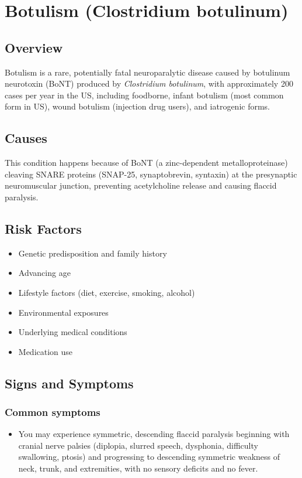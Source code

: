 \chapter{Botulism (Clostridium botulinum)}
\label{sec:Botulism}

\section{Overview}
Botulism is a rare, potentially fatal neuroparalytic disease caused by botulinum neurotoxin (BoNT) produced by \textit{Clostridium botulinum}, with approximately 200 cases per year in the US, including foodborne, infant botulism (most common form in US), wound botulism (injection drug users), and iatrogenic forms.
\section{Causes}
This condition happens because of BoNT (a zinc-dependent metalloproteinase) cleaving SNARE proteins (SNAP-25, synaptobrevin, syntaxin) at the presynaptic neuromuscular junction, preventing acetylcholine release and causing flaccid paralysis.     
\section{Risk Factors}

\begin{itemize}[noitemsep]
  \item Genetic predisposition and family history
  \item Advancing age
  \item Lifestyle factors (diet, exercise, smoking, alcohol)
  \item Environmental exposures
  \item Underlying medical conditions
  \item Medication use
\end{itemize}
\section{Signs and Symptoms}

\subsection{Common symptoms}
\begin{itemize}[noitemsep]
  \item You may experience symmetric, descending flaccid paralysis beginning with cranial nerve palsies (diplopia, slurred speech, dysphonia, difficulty swallowing, ptosis) and progressing to descending symmetric weakness of neck, trunk, and extremities, with no sensory deficits and no fever. 
  \end{itemize}

